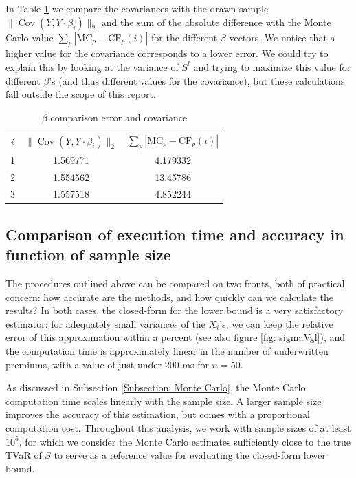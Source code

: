 \documentclass{article}
\DeclareMathOperator{\Cov}{Cov}
\begin{document}
In Table \ref{tab:betaComparison_dif} we compare the covariances with the drawn sample $\lVert \Cov(Y, Y \cdot \beta_i) \rVert_2$ and the sum of the absolute difference with the Monte Carlo value $\sum_p \left|\text{MC}_p - \text{CF}_p(i)\right|$ for the different $\beta$ vectors. We notice that a higher value for the covariance corresponds to a lower error. We could try to explain this by looking at the variance of $S^l$ and trying to maximize this value for different $\beta$'s (and thus different values for the covariance), but these calculations fall outside the scope of this report.


\begin{table}[h!]
	\centering
	\begin{tabular}{ccc}
		$i$ & $\lVert \Cov(Y, Y \cdot \beta_i) \rVert_2$ & $\sum_p \left|\text{MC}_p - \text{CF}_p(i)\right|$ \\
		1 & 1.569771 & 4.179332 \\
		2 & 1.554562 & 13.45786 \\
		3 & 1.557518 & 4.852244 \\
	\end{tabular}
	\caption{$\beta$ comparison error and covariance \label{tab:betaComparison_dif}}
\end{table}
\subsection{Comparison of execution time and accuracy in function of sample size}

The procedures outlined above can be compared on two fronts, both of practical concern: how accurate are the methods, and how quickly can we calculate the results? In both cases, the closed-form for the lower bound is a very satisfactory estimator: for adequately small variances of the $X_i$'s, we can keep the relative error of this approximation within a percent (see also figure \ref{fig: sigmaVgl}), and the computation time is approximately linear in the number of underwritten premiums, with a value of just under 200 ms for $n = 50$. 

As discussed in Subsection \ref{Subsection: Monte Carlo}, the Monte Carlo computation time scales linearly with the sample size.  A larger sample size improves the accuracy of this estimation, but comes with a proportional computation cost. Throughout this analysis, we work with sample sizes of at least $10^5$, for which we consider the Monte Carlo estimates sufficiently close to the true TVaR of $S$ to serve as a reference value for evaluating the closed-form lower bound. 
\end{document}
